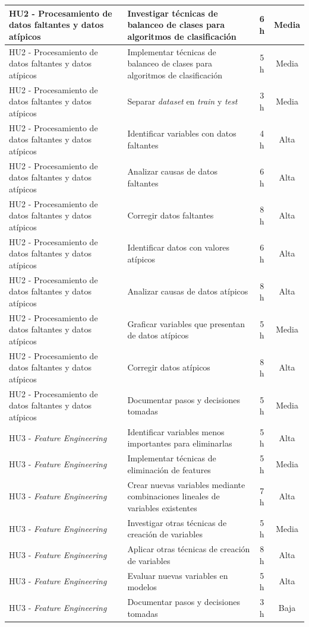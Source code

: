\documentclass[
11pt, %
]{charter}
\begin{document}
\begin{xltabular}{\linewidth}{@{}|X|X|c|c|@{}}
HU2 - Procesamiento de datos faltantes y datos atípicos & Investigar técnicas de balanceo de clases para algoritmos de clasificación & 6 h & Media \\ \hline
HU2 - Procesamiento de datos faltantes y datos atípicos & Implementar técnicas de balanceo de clases para algoritmos de clasificación & 5 h & Media \\ \hline
HU2 - Procesamiento de datos faltantes y datos atípicos & Separar \textit{dataset} en \textit{train} y \textit{test} & 3 h & Media \\ \hline
HU2 - Procesamiento de datos faltantes y datos atípicos & Identificar variables con datos faltantes & 4 h & Alta \\ \hline
HU2 - Procesamiento de datos faltantes y datos atípicos & Analizar causas de datos faltantes & 6 h & Alta \\ \hline
HU2 - Procesamiento de datos faltantes y datos atípicos & Corregir datos faltantes & 8 h & Alta \\ \hline
HU2 - Procesamiento de datos faltantes y datos atípicos & Identificar datos con valores atípicos & 6 h & Alta \\ \hline
HU2 - Procesamiento de datos faltantes y datos atípicos & Analizar causas de datos atípicos & 8 h & Alta \\ \hline
HU2 - Procesamiento de datos faltantes y datos atípicos & Graficar variables que presentan de datos atípicos & 5 h & Media \\ \hline
HU2 - Procesamiento de datos faltantes y datos atípicos & Corregir datos atípicos & 8 h & Alta \\ \hline
HU2 - Procesamiento de datos faltantes y datos atípicos & Documentar pasos y decisiones tomadas & 5 h & Media \\ \hline
HU3 - \textit{Feature Engineering} & Identificar variables menos importantes para eliminarlas & 5 h & Alta \\ \hline
HU3 - \textit{Feature Engineering} & Implementar técnicas de eliminación de features & 5 h & Media \\ \hline
HU3 - \textit{Feature Engineering} & Crear nuevas variables mediante combinaciones lineales de variables existentes & 7 h & Alta \\ \hline
HU3 - \textit{Feature Engineering} & Investigar otras técnicas de creación de variables & 5 h & Media \\ \hline
HU3 - \textit{Feature Engineering} & Aplicar otras técnicas de creación de variables & 8 h & Alta \\ \hline
HU3 - \textit{Feature Engineering} & Evaluar nuevas variables en modelos & 5 h & Alta \\ \hline
HU3 - \textit{Feature Engineering} & Documentar pasos y decisiones tomadas & 3 h & Baja \\ \hline


\end{xltabular}
\end{document}
